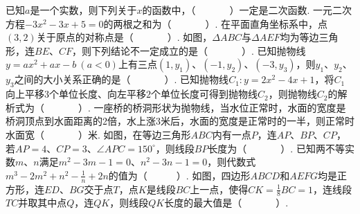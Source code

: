 \documentclass[10pt]{article}
\begin{document}
\showsecret
{}
\informationline
\begin{questions}{\selectingintroduction}
    \question 已知$a$是一个实数，则下列关于$x$的函数中，（~~~~~~~）一定是二次函数.
    \question 一元二次方程$-3x^2-3x+5=0$的两根之和为（~~~~~~~）.
    \question 在平面直角坐标系中，点$(3,2)$关于原点的对称点是（~~~~~~~）.
    \question 如图，$\Delta ABC$与$\Delta AEF$均为等边三角形，连$BE$、$CF$，则下列结论不一定成立的是（~~~~~~~）.
    \question 已知抛物线$y=ax^2+ax-b \ (a < 0)$上有三点$(1,y_1)$、$(-1,y_2)$、$(-3,y_3)$，则$y_1$、$y_2$、$y_3$之间的大小关系正确的是（~~~~~~~）.
    \question 已知抛物线$C_1:y=2x^2-4x+1$，将$C_1$向上平移$3$个单位长度、向左平移$2$个单位长度可得到抛物线$C_2$，则抛物线$C_2$的解析式为（~~~~~~~）.
    \question 一座桥的桥洞形状为抛物线，当水位正常时，水面的宽度是桥洞顶点到水面距离的2倍，水上涨3米后，水面的宽度是正常时的一半，则正常时水面宽（~~~~~~~）米.
    \question 如图，在等边三角形$ABC$内有一点$P$，连$AP$、$BP$、$CP$，若$AP=4$、$CP=3$、$\angle APC=150^{\circ}$，则线段$BP$长度为（~~~~~~~）.
    \question 已知两不等实数$m$、$n$满足$m^2-3m-1=0$、$n^2-3n-1=0$，则代数式$m^3-2m^2+n^2-\frac{1}{n}+2n$的值为（~~~~~~）.
    \question 如图，四边形$ABCD$和$AEFG$均是正方形，连$ED$、$BG$交于点$T$，点$K$是线段$BC$上一点，使得$CK=\frac{1}{8}BC=1$，连线段$TC$并取其中点$Q$，连$QK$，则线段$QK$长度的最大值是（~~~~~~~）.
    \begin{figure}[!htb]
        \centering
\end{figure}
\end{questions}
\end{document}
